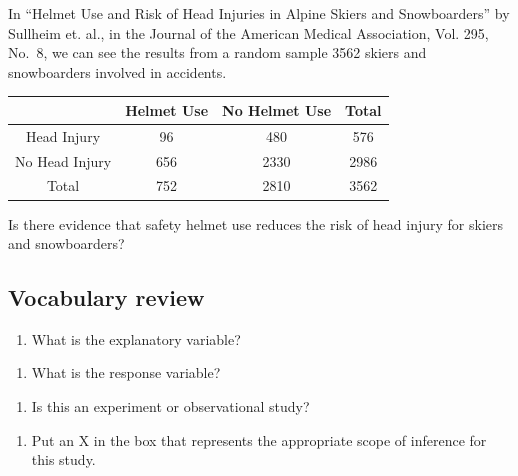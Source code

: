 \documentclass[
]{report}
\providecommand{\tightlist}{%
  \setlength{\itemsep}{0pt}\setlength{\parskip}{0pt}}
\begin{document}
In ``Helmet Use and Risk of Head Injuries in Alpine Skiers and Snowboarders'' by Sullheim et. al., in the Journal of the American Medical Association, Vol. 295, No.~8, we can see the results from a random sample 3562 skiers and snowboarders involved in accidents.

\begin{longtable}[]{@{}cccc@{}}
\toprule
& Helmet Use & No Helmet Use & Total\tabularnewline
\midrule
\endhead
Head Injury & 96 & 480 & 576\tabularnewline
No Head Injury & 656 & 2330 & 2986\tabularnewline
Total & 752 & 2810 & 3562\tabularnewline
\bottomrule
\end{longtable}

Is there evidence that safety helmet use reduces the risk of head injury for skiers and snowboarders?

\hypertarget{vocabulary-review}{%
\subsection{Vocabulary review}\label{vocabulary-review}}

\begin{enumerate}
\def\labelenumi{\arabic{enumi}.}
\tightlist
\item
  What is the explanatory variable?
\end{enumerate}

\vspace{0.5in}

\begin{enumerate}
\def\labelenumi{\arabic{enumi}.}
\setcounter{enumi}{1}
\tightlist
\item
  What is the response variable?
\end{enumerate}

\vspace{0.5in}

\begin{enumerate}
\def\labelenumi{\arabic{enumi}.}
\setcounter{enumi}{2}
\tightlist
\item
  Is this an experiment or observational study?
\end{enumerate}

\vspace{0.3in}

\begin{enumerate}
\def\labelenumi{\arabic{enumi}.}
\setcounter{enumi}{3}
\tightlist
\item
  Put an X in the box that represents the appropriate scope of inference for this study.
\end{enumerate}
\end{document}

